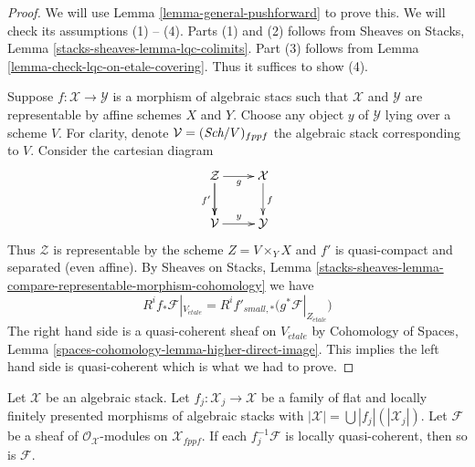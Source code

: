 \begin{proof}
We will use
Lemma \ref{lemma-general-pushforward}
to prove this. We will check its assumptions (1) -- (4).
Parts (1) and (2) follows from
Sheaves on Stacks, Lemma \ref{stacks-sheaves-lemma-lqc-colimits}.
Part (3) follows from
Lemma \ref{lemma-check-lqc-on-etale-covering}.
Thus it suffices to show (4).

\medskip\noindent
Suppose $f : \mathcal{X} \to \mathcal{Y}$ is a morphism of algebraic stacs
such that $\mathcal{X}$ and $\mathcal{Y}$ are representable by affine
schemes $X$ and $Y$. Choose any object $y$ of $\mathcal{Y}$ lying over a
scheme $V$. For clarity, denote $\mathcal{V} = (\textit{Sch}/V)_{fppf}$ the
algebraic stack corresponding to $V$. Consider the cartesian diagram
$$
\xymatrix{
\mathcal{Z} \ar[d] \ar[r]_g \ar[d]_{f'} & \mathcal{X} \ar[d]^f \\
\mathcal{V} \ar[r]^y & \mathcal{Y}
}
$$
Thus $\mathcal{Z}$ is representable by the scheme $Z = V \times_Y X$
and $f'$ is quasi-compact and separated (even affine). By
Sheaves on Stacks, Lemma
\ref{stacks-sheaves-lemma-compare-representable-morphism-cohomology}
we have
$$
R^if_*\mathcal{F}|_{V_{\acute{e}tale}} =
R^if'_{small, *}\big(g^*\mathcal{F}|_{Z_{\acute{e}tale}}\big)
$$
The right hand side is a quasi-coherent sheaf on $V_{\acute{e}tale}$ by
Cohomology of Spaces, Lemma
\ref{spaces-cohomology-lemma-higher-direct-image}.
This implies the left hand side is quasi-coherent which is what
we had to prove.
\end{proof}

\begin{lemma}
\label{lemma-check-lqc-on-flat-covering}
Let $\mathcal{X}$ be an algebraic stack. Let
$f_j : \mathcal{X}_j \to \mathcal{X}$ be a family of flat
and locally finitely presented morphisms of algebraic stacks with
$|\mathcal{X}| =\bigcup |f_j|(|\mathcal{X}_j|)$.
Let $\mathcal{F}$ be a sheaf of $\mathcal{O}_\mathcal{X}$-modules
on $\mathcal{X}_{fppf}$. If each $f_j^{-1}\mathcal{F}$
is locally quasi-coherent, then so is $\mathcal{F}$.
\end{lemma}

